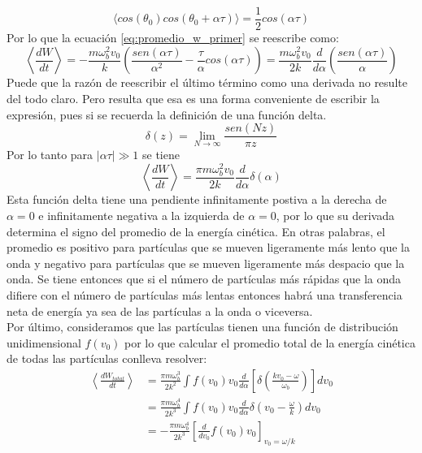 \documentclass[../tesis_main_file.tex]{subfiles}
\begin{document}
\begin{equation}
\langle cos(\theta_0)cos(\theta_0 +\alpha\tau)\rangle =\frac{1}{2}cos(\alpha\tau)
\end{equation}
Por lo que la ecuación \ref{eq:promedio_w_primer} se reescribe como:
\begin{equation}
\label{eq:promedio_w_segunda}
\left\langle \frac{dW}{dt}\right\rangle= -\frac{m\omega_b^2v_0}{k}\left(\frac{sen(\alpha\tau)}{\alpha^2}-\frac{\tau}{\alpha}cos(\alpha\tau)\right)= \frac{m\omega_b^2v_0}{2k}\frac{d}{d\alpha}\left(\frac{sen(\alpha\tau)}{\alpha}\right)
\end{equation}
Puede que la razón de reescribir el último término como una derivada no resulte del todo claro. Pero resulta que esa es una forma conveniente de escribir la expresión, pues si se recuerda la definición de una función delta.
\begin{equation}
\label{eq:delta_function_definition}
\delta (z) =\lim_{N\to\infty}\frac{sen(Nz)}{\pi z}
\end{equation}
Por lo tanto para $|\alpha\tau| \gg 1$ se tiene
\begin{equation}
\label{eq:promedio_w_tercera}
\left\langle \frac{dW}{dt}\right\rangle=\frac{\pi m\omega_b^2v_0}{2k}\frac{d}{d\alpha}\delta(\alpha)
\end{equation}
Esta función delta tiene una pendiente infinitamente postiva a la derecha de $\alpha=0$ e infinitamente negativa a la izquierda de $\alpha=0$, por lo que su derivada determina el signo del promedio de la energía cinética. En otras palabras, el promedio es positivo para partículas que se mueven ligeramente más lento que la onda y negativo para partículas que se mueven ligeramente más despacio que la onda. Se tiene entonces que si el número de partículas más rápidas que la onda difiere con el número de partículas más lentas entonces habrá una transferencia neta de energía ya sea de las partículas a la onda o viceversa.\\
Por último, consideramos que las partículas tienen una función de distribución unidimensional $f(v_0)$ por lo que calcular el promedio total de la energía cinética de todas las partículas conlleva resolver:
\begin{align}
\left\langle \frac{dW_{total}}{dt}\right\rangle &=  \frac{\pi m\omega_b^3}{2k^2}\int f(v_0)v_0\frac{d}{d\alpha}\left[\delta\left(\frac{kv_0-\omega}{\omega_b}\right)\right]dv_0\\
&=\frac{\pi m\omega_b^4}{2k^3}\int f(v_0)v_0\frac{d}{d\alpha}\delta \left(v_0 -\frac{\omega}{k}\right)dv_0\\
&=-\frac{\pi m\omega_b^4}{2k^3}\left[\frac{d}{dv_0}f(v_0)v_0\right]_{v_0=\omega /k}
\end{align}
\end{document}
